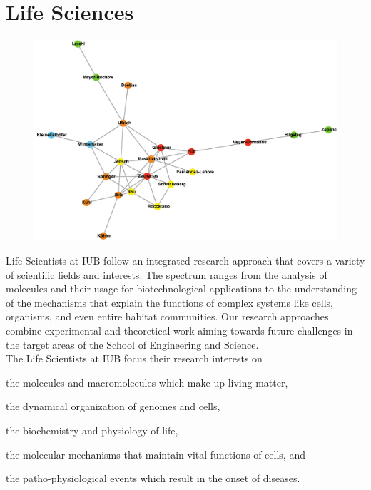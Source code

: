 \section{Life Sciences}

\begin{figure}[ht]
  \begin{center}
   \includegraphics[width=\hsize]{network_LifeSci1_tmp03.pdf}
    \label{fig:LifeSc}
   \end{center}
\end{figure}


Life Scientists at IUB follow an integrated research approach that covers a variety of scientific fields and interests. The spectrum ranges from the analysis of molecules and their usage for biotechnological applications to the understanding of the mechanisms that explain the functions of complex systems like cells, organisms, and even entire habitat communities. Our research approaches combine experimental and theoretical work aiming towards future challenges in the target areas of the School of Engineering and Science. \\

The Life Scientists at IUB focus their research interests on
\begin{myitemize}
\item   the molecules and macromolecules which make up living matter,
\item the dynamical organization of genomes and cells,
\item   the biochemistry and physiology of life,
\item   the molecular mechanisms that maintain vital functions of cells, and
\item   the patho-physiological events which result in the onset of diseases.\\
\end{myitemize}


